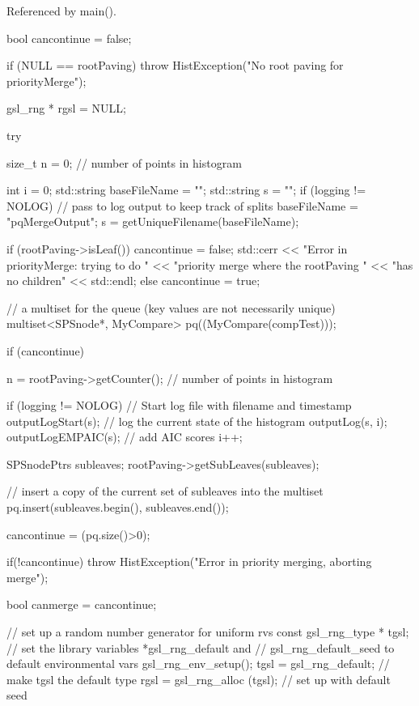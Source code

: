 \-Referenced by main().


\begin{DoxyCode}
{
    bool cancontinue = false;

    if (NULL == rootPaving) {
            throw HistException("No root paving for priorityMerge");
    }

    gsl_rng * rgsl = NULL;

    try {
        size_t n = 0; // number of points in histogram

        int i = 0;
        std::string baseFileName = "";
        std::string s = "";
        if (logging != NOLOG) {
            // pass to log output to keep track of splits
            baseFileName = "pqMergeOutput";
            s = getUniqueFilename(baseFileName);
        }

        if (rootPaving->isLeaf()) {
            cancontinue = false;
            std::cerr << "Error in priorityMerge: trying to do "
                << "priority merge where the rootPaving "
                << "has no children" << std::endl;
        }
        else cancontinue = true;

        // a multiset for the queue (key values are not necessarily unique)
        multiset<SPSnode*, MyCompare> pq((MyCompare(compTest)));

        if (cancontinue) {
            n = rootPaving->getCounter(); // number of points in histogram

            if (logging != NOLOG) {
                 // Start log file with filename and timestamp
                outputLogStart(s);
                // log the current state of the histogram
                outputLog(s, i);
                outputLogEMPAIC(s); // add AIC scores
                i++;
            }

            SPSnodePtrs subleaves;
            rootPaving->getSubLeaves(subleaves);

            // insert a copy of the current set of subleaves into the multiset
            pq.insert(subleaves.begin(), subleaves.end());

            cancontinue = (pq.size()>0);
        }

        if(!cancontinue) {
            throw HistException("Error in priority merging, aborting merge");
        }

        bool canmerge = cancontinue;

        // set up a random number generator for uniform rvs
        const gsl_rng_type * tgsl;
        // set the library variables *gsl_rng_default and
        // gsl_rng_default_seed to default environmental vars
        gsl_rng_env_setup();
        tgsl = gsl_rng_default; // make tgsl the default type
        rgsl = gsl_rng_alloc (tgsl); // set up with default seed

}}
\end{DoxyCode}
